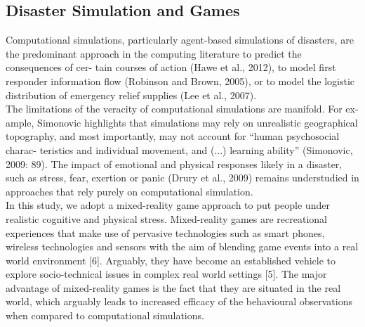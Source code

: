 \subsection{ Disaster Simulation and Games }

Computational simulations, particularly agent-based simulations of disasters, are the predominant approach in the computing literature to predict the consequences of cer- tain courses of action (Hawe et al., 2012), to model first responder information flow (Robinson and Brown, 2005), or to model the logistic distribution of emergency relief supplies (Lee et al., 2007).\\

The limitations of the veracity of computational simulations are manifold. For ex- ample, Simonovic highlights that simulations may rely on unrealistic geographical topography, and most importantly, may not account for “human psychosocial charac- teristics and individual movement, and (...) learning ability” (Simonovic, 2009: 89). The impact of emotional and physical responses likely in a disaster, such as stress, fear, exertion or panic (Drury et al., 2009) remains understudied in approaches that rely purely on computational simulation.\\


In this study, we adopt a mixed-reality game approach to put people under realistic cognitive and physical stress. Mixed-reality games are recreational experiences that make use of pervasive technologies such as smart phones, wireless technologies and sensors with the aim of blending game events into a real world environment [6]. Arguably, they have become an established vehicle to explore socio-technical issues in complex real world settings [5]. The major advantage of mixed-reality games is the fact that they are situated in the real world, which arguably leads to increased efficacy of the behavioural observations when compared to computational simulations.\\



